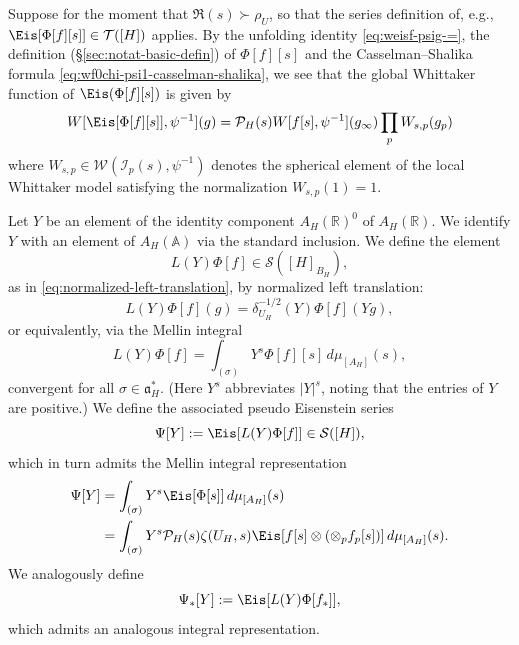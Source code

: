 Suppose for the moment that $\Re(s) \succ \rho_U$, so that the series definition of, e.g., $\Eis[\Phi[f][s]] \in \mathcal{T}([H])$ applies.  By the unfolding identity \eqref{eq:weisf-psig-=}, the definition (\S\ref{sec:notat-basic-defin}) of $\Phi[f][s]$ and the Casselman--Shalika formula \eqref{eq:wf0chi-psi1-casselman-shalika}, we see that the global Whittaker function of $\Eis(\Phi[f][s])$ is given by
\begin{equation}\label{eq:weisphis-psi-1g}
  W[\Eis[\Phi[f][s]], \psi^{-1}](g)
  =
  \mathcal{P}_H(s)
  W[f[s], \psi^{-1}](g_\infty)
  \prod_p W_{s,p}(g_p)
\end{equation}
where $W_{s,p} \in \mathcal{W}(\mathcal{I}_p(s), \psi^{-1})$ denotes the spherical element of the local Whittaker model satisfying the normalization ${W}_{s,p}(1) = 1$.

Let $Y$ be an element of the identity component $A_H(\mathbb{R})^0$ of $A_H(\mathbb{R})$.  We identify $Y$ with an element of $A_H(\mathbb{A})$ via the standard inclusion.  We define the element
\begin{equation*}
  L(Y) \Phi[f] \in \mathcal{S}([H]_{B_H}),
\end{equation*}
as in \eqref{eq:normalized-left-translation}, by normalized left translation:
\begin{equation}\label{eq:ly-phig-=}
  L(Y) \Phi[f](g) = \delta_{U_H}^{-1/2}(Y) \Phi[f](Y g),
\end{equation}
or equivalently, via the Mellin integral
\begin{equation*}
  L(Y) \Phi[f] = \int_{(\sigma)} Y^{s} \Phi[f][s] \, d \mu_{[A_H]}(s),
\end{equation*}
convergent for all $\sigma \in \mathfrak{a}_H^*$.  (Here $Y^s$ abbreviates $|Y|^s$, noting that the entries of $Y$ are positive.)  We define the associated pseudo Eisenstein series 
\begin{equation*}
  \Psi[Y] := \Eis[L(Y) \Phi[f]] \in \mathcal{S}([H]),
\end{equation*}
which in turn admits the Mellin integral representation
\begin{align*}
  \Psi[Y] &=
         \int_{(\sigma)} Y^{s}
         \Eis[\Phi[s]]
         \, d \mu_{[A_H]}(s) \\
       &=
         \int_{(\sigma)}
         Y^{s} \mathcal{P}_H(s) \zeta(U_H,s)
         \Eis[f[s] \otimes (\otimes_{p} f_p[s])] \, d \mu_{[A_H]}(s).
\end{align*}
We analogously define
\begin{equation*}
  \Psi_{\ast}[Y] := \Eis[L(Y) \Phi[f_{\ast}]],
\end{equation*}
which admits an analogous integral representation.

